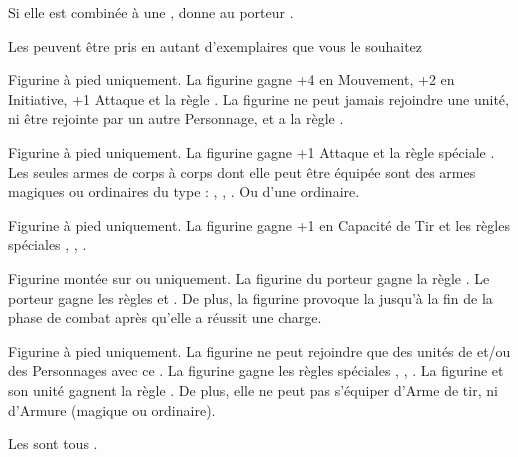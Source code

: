 \listitemonecol{\elvencloak} Si elle est combinée à une \la{}, donne au porteur .

\enditemlistonecol

\closearmyarmoury

\begin{multicols}{2}
\startarmynewsection{\kindreds}

\spaceaftersection{}

Les \kindreds{} peuvent être pris en autant d'exemplaires que vous le souhaitez

\startpricelistNSP

Figurine à pied uniquement. La figurine gagne +4 en Mouvement, +2 en Initiative, +1 Attaque et la règle . La figurine ne peut jamais rejoindre une unité, ni être rejointe par un autre Personnage, et a la règle \notaleader{}.

Figurine à pied uniquement. La figurine gagne +1 Attaque et la règle spéciale . Les seules armes de corps à corps dont elle peut être équipée sont des armes magiques ou ordinaires du type : \spear{}, \greatweapon{}, \sylvanblades{}. Ou d'une \hw{} ordinaire.

Figurine à pied uniquement. La figurine gagne +1 en Capacité de Tir et les règles spéciales \scout{}, \masterarchers{}, .

Figurine montée sur \elvenhorse{} ou \greatelk{} uniquement. La figurine du porteur gagne la règle \frenzy{}. Le porteur gagne les règles \devastatingcharge{} et \lighttroops{}. De plus, la figurine provoque la \fear{} jusqu'à la fin de la phase de combat après qu'elle a réussit une charge.

Figurine à pied uniquement. La figurine ne peut rejoindre que des unités de \bladedancers{} et/ou des Personnages avec ce \kindreds{}. La figurine gagne les règles spéciales \dancesofcenyrn{}, \immunetopsychology{}, . La figurine et son unité gagnent la règle \swiftstride{}. De plus, elle ne peut pas s'équiper d'Arme de tir, ni d'Armure (magique ou ordinaire).

\endpricelistNSP

\startarmynewsection{\kindreds}

\spaceaftersection{}

Les \aspectsofnature{} sont tous \oneperarmy{}.


\end{multicols}
